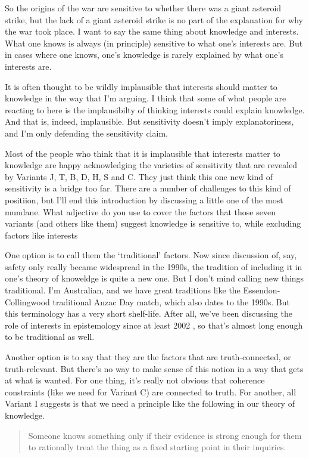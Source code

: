 \documentclass[11pt,]{book}
\begin{document}
So the origins of the war are sensitive to whether there was a giant asteroid strike, but the lack of a giant asteroid strike is no part of the explanation for why the war took place. I want to say the same thing about knowledge and interests. What one knows is always (in principle) sensitive to what one's interests are. But in cases where one knows, one's knowledge is rarely explained by what one's interests are.

It is often thought to be wildly implausible that interests should matter to knowledge in the way that I'm arguing. I think that some of what people are reacting to here is the implausibilty of thinking interests could explain knowledge. And that is, indeed, implausible. But sensitivity doesn't imply explanatoriness, and I'm only defending the sensitivity claim.

Most of the people who think that it is implausible that interests matter to knowledge are happy acknowledging the varieties of sensitivity that are revealed by Variants J, T, B, D, H, S and C. They just think this one new kind of sensitivity is a bridge too far. There are a number of challenges to this kind of positiion, but I'll end this introduction by discussing a little one of the most mundane. What adjective do you use to cover the factors that those seven variants (and others like them) suggest knowledge is sensitive to, while excluding factors like interests

One option is to call them the `traditional' factors. Now since discussion of, say, safety only really became widespread in the 1990s, the tradition of including it in one's theory of knoweldge is quite a new one. But I don't mind calling new things traditional. I'm Australian, and we have great traditions like the Essendon-Collingwood traditional Anzac Day match, which also dates to the 1990s. But this terminology has a very short shelf-life. After all, we've been discussing the role of interests in epistemology since at least 2002 \citep{FantlMcGrath2002}, so that's almost long enough to be traditional as well.

Another option is to say that they are the factors that are truth-connected, or truth-relevant. But there's no way to make sense of this notion in a way that gets at what is wanted. For one thing, it's really not obvious that coherence constraints (like we need for Variant C) are connected to truth. For another, all Variant I suggests is that we need a principle like the following in our theory of knowledge.

\begin{quote}
Someone knows something only if their evidence is strong enough for them to rationally treat the thing as a fixed starting point in their inquiries.
\end{quote}
\end{document}
